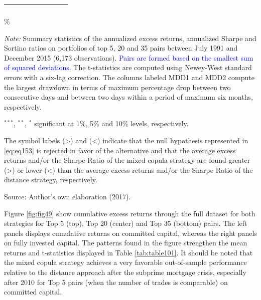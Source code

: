 \documentclass[a4paper,12pt]{report}
\begin{document}
\begin{threeparttable}[H]
\begin{tabularx}{\textwidth}{@{\extracolsep{\fill}}llllllll@{}}
			\multicolumn{1}{r}{} & \multicolumn{1}{r}{} & \multicolumn{1}{r}{} & \multicolumn{1}{r}{} & \multicolumn{1}{r}{} & \multicolumn{1}{r}{} & \multicolumn{1}{r}{} & \multicolumn{1}{r}{} \\
			\bottomrule
		\end{tabularx}\%
		\begin{tablenotes}
			\item \textit{Note:} \scriptsize \tiny Summary statistics of the annualized excess returns, annualized Sharpe and Sortino ratios on portfolios of top 5, 20 and 35 pairs between July 1991 and December 2015 (6,173 observations). \textcolor{blue} {Pairs are formed based on the smallest sum of squared deviations}. The t-statistics are computed using Newey-West standard errors with a six-lag correction. The columns labeled MDD1 and MDD2 compute the largest drawdown in terms of maximum percentage drop between two consecutive days and between two days within a period of maximum six months, respectively.
			\item \scriptsize $^{\ast\ast\ast}$, $^{\ast\ast}$, $^{\ast}$  significant at 1\%, 5\% and 10\% levels, respectively.
			\item \tiny The symbol labels (>) and (<) indicate that the null hypothesis represented in \ref{eq:eq153} is rejected in favor of the alternative and that the average excess returns and/or the Sharpe Ratio of the mixed copula strategy are found greater (>) or lower (<) than the average excess returns and/or the Sharpe Ratio of the distance strategy, respectively.
			\item Source: Author's own elaboration (2017).
		\end{tablenotes}
		\label{tab:table101}
	\end{threeparttable}
	
	
	\vspace{0.6cm}
	
	
	Figure \ref{fig:fig49} show cumulative excess returns through the full dataset for both strategies for Top 5 (top), Top 20 (center) and Top 35 (bottom) pairs. The left panels displays cumulative returns on committed capital, whereas the right panels on fully invested capital. The patterns found in the figure strengthen the mean returns and t-statistics displayed in Table \ref{tab:table101}. It should be noted that the mixed copula strategy achieves a very favorable out-of-sample performance relative to the distance approach after the subprime mortgage crisis, especially after 2010 for Top 5 pairs (when the number of trades is comparable) on committed capital. 
	
\end{document}
